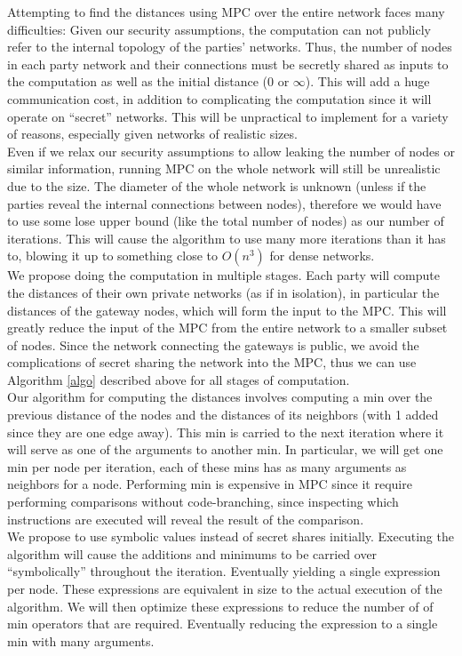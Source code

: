 Attempting to find the distances using MPC over the entire network faces many difficulties: Given our security assumptions, the computation can not publicly refer to the internal topology of the parties' networks. Thus, the number of nodes in each party network and their connections must be secretly shared as inputs to the computation as well as the initial distance ($0$ or $\infty$). This will add a huge communication cost, in addition to complicating the computation since it will operate on ``secret'' networks. This will be unpractical to implement for a variety of reasons, especially given networks of realistic sizes. \\

Even if we relax our security assumptions to allow leaking the number of nodes or similar information, running MPC on the whole network will still be unrealistic due to the size. The diameter of the whole network is unknown (unless if the parties reveal the internal connections between nodes), therefore we would have to use some lose upper bound (like the total number of nodes) as our number of iterations. This will cause the algorithm to use many more iterations than it has to, blowing it up to something close to $O(n^3)$ for dense networks. \\

We propose doing the computation in multiple stages. Each party will compute the distances of their own private networks (as if in isolation), in particular the distances of the gateway nodes, which will form the input to the MPC. This will greatly reduce the input of the MPC from the entire network to a smaller subset of nodes. Since the network connecting the gateways is public, we avoid the complications of secret sharing the network into the MPC, thus we can use Algorithm \ref{algo} described above for all stages of computation. \\

Our algorithm for computing the distances involves computing a min over the previous distance of the nodes and the distances of its neighbors (with 1 added since they are one edge away). This min is carried to the next iteration where it will serve as one of the arguments to another min. In particular, we will get one min per node per iteration, each of these mins has as many arguments as neighbors for a node. Performing min is expensive in MPC since it require performing comparisons without code-branching, since inspecting which instructions are executed will reveal the result of the comparison. \\

We propose to use symbolic values instead of secret shares initially. Executing the algorithm will cause the additions and minimums to be carried over ``symbolically'' throughout the iteration. Eventually yielding a single expression per node. These expressions are equivalent in size to the actual execution of the algorithm. We will then optimize these expressions to reduce the number of of min operators that are required. Eventually reducing the expression to a single min with many arguments. \\
